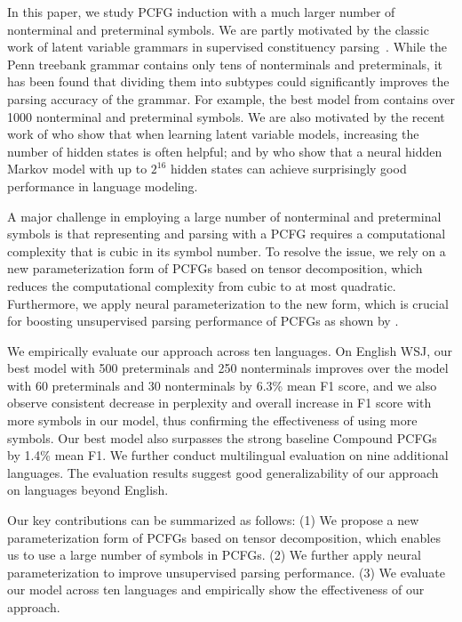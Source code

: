 \documentclass[11pt]{article}
\begin{document}
In this paper, we study PCFG induction with a much larger number of nonterminal and preterminal symbols.
We are partly motivated by the classic work of latent variable grammars in supervised constituency parsing~\citep{matsuzaki-etal-2005-probabilistic,petrov-etal-2006-learning,liang-etal-2007-infinite,cohen-etal-2012-spectral,zhao-etal-2018-gaussian}. While the Penn treebank grammar contains only tens of nonterminals and preterminals, it has been found that dividing them into subtypes could significantly improves the parsing accuracy of the grammar. For example, the best model from \citet{petrov-etal-2006-learning} contains over 1000 nonterminal and preterminal symbols.
We are also motivated by the recent work of \citet{buhai2019empirical} who show that when learning latent variable models, increasing the number of hidden states is often helpful; and by \citet{chiu-rush-2020-scaling} who show that a neural hidden Markov model with up to $2^{16}$ hidden states can achieve surprisingly good performance in language modeling. 








A major challenge in employing a large number of nonterminal and preterminal symbols is that representing and parsing with a PCFG requires a computational complexity that is cubic in its symbol number.
To resolve the issue, we rely on a new parameterization form of PCFGs based on tensor decomposition, which reduces the computational complexity from cubic to at most quadratic.
Furthermore, we apply neural parameterization to the new form, which is crucial for boosting unsupervised parsing performance of PCFGs as shown by \citet{kim-etal-2019-compound}.


We empirically evaluate our approach across ten languages.
On English WSJ, 
our best model with 500 preterminals and 250 nonterminals 
improves over the model with 60 preterminals and 30 nonterminals by 6.3\% mean F1 score, and we also observe consistent decrease in perplexity and overall increase in F1 score with more symbols in our model,
thus confirming the effectiveness of using more symbols.
Our best model also surpasses the strong baseline Compound PCFGs~\citep{kim-etal-2019-compound} by 1.4\% mean F1.
We further conduct multilingual evaluation on nine additional languages.
The evaluation results suggest good generalizability of our approach on languages beyond English.

Our key contributions can be summarized as follows:
(1) We propose a new parameterization form of PCFGs based on tensor decomposition, which enables us to use a large number of symbols in PCFGs.
(2) We further apply neural parameterization to improve unsupervised parsing performance.
(3) We evaluate our model across ten languages and empirically show the effectiveness of our approach.
\end{document}
